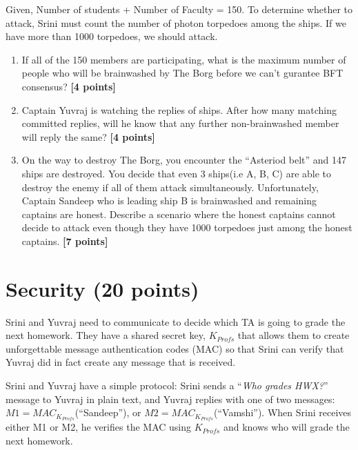 \documentclass{article}
\begin{document}
Given, Number of students + Number of Faculty = 150. To determine whether to attack, Srini must count the number of photon torpedoes among the ships. If we have more than 1000 torpedoes, we should attack.

\begin{enumerate}
\item{ If all of the 150 members are participating, what is the maximum number of people who will be brainwashed by The Borg before we can't gurantee BFT consensus? \textbf{[4 points]}}

\item{ Captain Yuvraj is watching the replies of ships. After how many matching committed replies, will he know that any further non-brainwashed member will reply the same? \textbf{[4 points]}}

\item{ On the way to destroy The Borg, you encounter the ``Asteriod belt'' and 147 ships are destroyed. You decide that even 3 ships(i.e A, B, C) are able to destroy the enemy if all of them attack simultaneously. Unfortunately, Captain Sandeep who is leading ship B is brainwashed and remaining captains are honest. Describe a scenario where the honest captains cannot decide to attack even though they have 1000 torpedoes just among the honest captains. \textbf{[7 points]}}

\end{enumerate}

\section{Security (20 points)}
Srini and Yuvraj need to communicate to decide which TA is going to grade the next homework.  They have a shared secret key, $K_{Profs}$ that allows them to create unforgettable message authentication codes (MAC) so that Srini can verify that Yuvraj did in fact create any message that is received.  

Srini and Yuvraj have a simple protocol:  Srini sends a ``\textit{Who grades HWX?}'' message to Yuvraj in plain text, and Yuvraj replies with one of two messages: $M1 = MAC_{K_{Profs}}$(``Sandeep''), or
$M2 =  MAC_{K_{Profs}}$(``Vamshi'').  When Srini receives either M1 or M2, he verifies the MAC using $K_{Profs}$ and knows who will grade the next homework.
\end{document}

